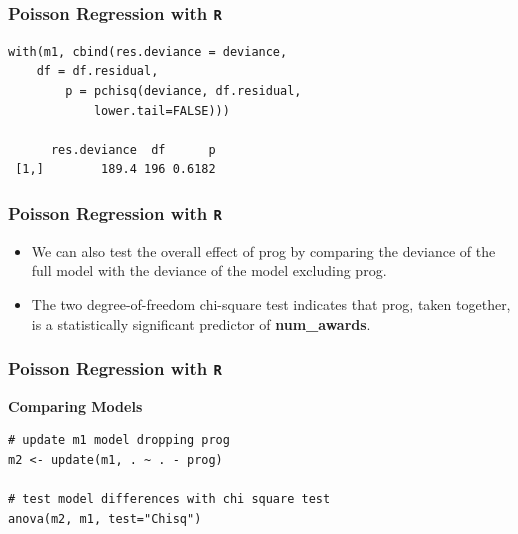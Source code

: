\documentclass[00-GLMregslides.tex]{subfiles}
\begin{document}
\begin{frame}[fragile]

\frametitle{Poisson Regression with \texttt{R}}
\large

\begin{framed}
\begin{verbatim}
with(m1, cbind(res.deviance = deviance, 
	df = df.residual,
        p = pchisq(deviance, df.residual, 
            lower.tail=FALSE)))
 
      res.deviance  df      p
 [1,]        189.4 196 0.6182
\end{verbatim}
\end{framed}
\end{frame}

\begin{frame}[fragile]

\frametitle{Poisson Regression with \texttt{R}}
\Large 
\begin{itemize}
\item 
We can also test the overall effect of prog by comparing the deviance of the full model with the deviance of the model 
excluding prog.
\item The two degree-of-freedom chi-square test indicates that prog, taken together, is a statistically significant predictor of \textbf{num\_awards}.
\end{itemize} 

\end{frame}

\begin{frame}[fragile]

\frametitle{Poisson Regression with \texttt{R}}
\large
\textbf{Comparing Models}
\begin{framed}
\begin{verbatim}
# update m1 model dropping prog
m2 <- update(m1, . ~ . - prog)

# test model differences with chi square test
anova(m2, m1, test="Chisq")
\end{verbatim}
\end{framed}
\end{frame}
\end{document}
